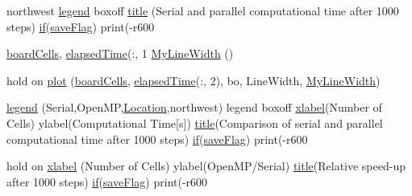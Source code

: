 \begin{DoxyCompactItemize}
\item 
northwest \hyperlink{a00100_a6b5fce02da94e50d48e15f2c186a9525}{legend} boxoff \hyperlink{a00100_ab3bb8d2ccba4f8c652d3aa7ea8cd0367}{title} (\textquotesingle{}Serial and parallel computational time after 1000 steps\textquotesingle{}) \hyperlink{a00107_adaccd24104cadc8933e48c3a5569e23f}{if}(\hyperlink{a00100_ae484b320b0f28c87f6742b7c5ee9e80d}{save\+Flag}) print(\textquotesingle{}-\/r600\textquotesingle{}
\item 
\hyperlink{a00100_a9a8e1837f52184441d209914b37780be}{board\+Cells}, \hyperlink{a00100_aa34a8c2af1a2f3a8758e70eafba9d319}{elapsed\+Time}(\+:, 1 \hyperlink{a00100_a76b83ba444571bd585a06a5e6740202e}{My\+Line\+Width} ()
\item 
hold on \hyperlink{a00100_ac7a35f0900e572fd6058bb3aae01992e}{plot} (\hyperlink{a00100_a9a8e1837f52184441d209914b37780be}{board\+Cells}, \hyperlink{a00100_aa34a8c2af1a2f3a8758e70eafba9d319}{elapsed\+Time}(\+:, 2), \textquotesingle{}bo\textquotesingle{}, \textquotesingle{}Line\+Width\textquotesingle{}, \hyperlink{a00100_a76b83ba444571bd585a06a5e6740202e}{My\+Line\+Width})
\item 
\hyperlink{a00100_a6b5fce02da94e50d48e15f2c186a9525}{legend} (\textquotesingle{}Serial\textquotesingle{},\textquotesingle{}Open\+M\+P\textquotesingle{},\textquotesingle{}\hyperlink{a00100_aecaf6a9545fa815deb4b8e64e144ce43}{Location}\textquotesingle{},\textquotesingle{}northwest\textquotesingle{}) legend boxoff \hyperlink{a00100_a9631c9680ea42ff07c77a814dbdc9052}{xlabel}(\textquotesingle{}Number of Cells\textquotesingle{}) ylabel(\textquotesingle{}Computational Time\mbox{[}s\mbox{]}\textquotesingle{}) \hyperlink{a00100_ab3bb8d2ccba4f8c652d3aa7ea8cd0367}{title}(\textquotesingle{}Comparison of serial and parallel computational time after 1000 steps\textquotesingle{}) \hyperlink{a00107_adaccd24104cadc8933e48c3a5569e23f}{if}(\hyperlink{a00100_ae484b320b0f28c87f6742b7c5ee9e80d}{save\+Flag}) print(\textquotesingle{}-\/r600\textquotesingle{}
\item 
hold on \hyperlink{a00100_a9631c9680ea42ff07c77a814dbdc9052}{xlabel} (\textquotesingle{}Number of Cells\textquotesingle{}) ylabel(\textquotesingle{}Open\+M\+P/Serial\textquotesingle{}) \hyperlink{a00100_ab3bb8d2ccba4f8c652d3aa7ea8cd0367}{title}(\textquotesingle{}Relative speed-\/up after 1000 steps\textquotesingle{}) \hyperlink{a00107_adaccd24104cadc8933e48c3a5569e23f}{if}(\hyperlink{a00100_ae484b320b0f28c87f6742b7c5ee9e80d}{save\+Flag}) print(\textquotesingle{}-\/r600\textquotesingle{}
\end{DoxyCompactItemize}
